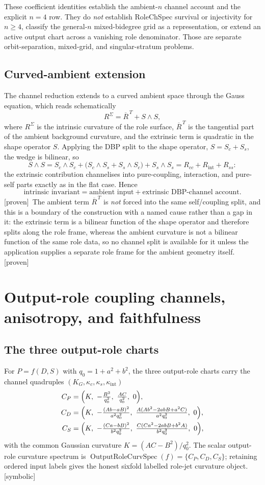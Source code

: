 \documentclass[11pt]{article}
\newcommand{\Proven}{\textsf{[proven]}}
\newcommand{\Symbolic}{\textsf{[symbolic]}}
\theoremstyle{plain}
\theoremstyle{definition}
\newcommand{\KG}{K_{G}}
\newcommand{\kc}{\kappa_{c}}
\newcommand{\kint}{\kappa_{\mathrm{int}}}
\newcommand{\ks}{\kappa_{s}}
\begin{document}
These coefficient identities establish the ambient-$n$ channel account and the explicit $n=4$ row.
They do \emph{not} establish RoleChSpec survival or injectivity for $n\ge4$, classify the general-$n$
mixed-bidegree grid as a representation, or extend an active output chart across a vanishing role
denominator.  Those are separate orbit-separation, mixed-grid, and singular-stratum problems.

\subsection{Curved-ambient extension}
The channel reduction extends to a curved ambient space through the Gauss equation, which reads
schematically
\[
R^\Sigma=\overline R^{\,T}+S\wedge S,
\]
where $R^\Sigma$ is the intrinsic curvature of the role surface, $\overline R^{\,T}$ is the tangential
part of the ambient background curvature, and the extrinsic term is quadratic in the shape operator
$S$. Applying the DBP split to the shape operator, $S=S_c+S_s$, the wedge is bilinear, so
\[
S\wedge S=S_c\wedge S_c+\bigl(S_c\wedge S_s+S_s\wedge S_c\bigr)+S_s\wedge S_s
=R_{cc}+R_{\mathrm{int}}+R_{ss}:
\]
the extrinsic contribution channelises into pure-coupling, interaction, and pure-self parts exactly as
in the flat case. Hence
\[
\text{intrinsic invariant}=\text{ambient input}+\text{extrinsic DBP-channel account}. 
\]
\Proven\ The ambient term $\overline R^{\,T}$ is \emph{not} forced into the same self/coupling split,
and this is a boundary of the construction with a named cause rather than a gap in it: the extrinsic
term is a bilinear function of the shape operator and therefore splits along the role frame, whereas
the ambient curvature is not a bilinear function of the same role data, so no channel split is
available for it unless the application supplies a separate role frame for the ambient geometry
itself. \Proven

\section{Output-role coupling channels, anisotropy, and faithfulness}
\label{sec:channels-named}

\subsection{The three output-role charts}
For $P=f(D,S)$ with $q_0=1+a^2+b^2$, the three output-role charts carry the channel quadruples
$(\KG,\kc,\ks,\kint)$
\begin{align*}
C_P&=\Bigl(K,\ -\tfrac{B^2}{q_0^2},\ \tfrac{AC}{q_0^2},\ 0\Bigr),\\
C_D&=\Bigl(K,\ -\tfrac{(Ab-aB)^2}{a^2q_0^2},\ \tfrac{A(Ab^2-2abB+a^2C)}{a^2q_0^2},\ 0\Bigr),\\
C_S&=\Bigl(K,\ -\tfrac{(Ca-bB)^2}{b^2q_0^2},\ \tfrac{C(Ca^2-2abB+b^2A)}{b^2q_0^2},\ 0\Bigr),
\end{align*}
with the common Gaussian curvature $K=(AC-B^2)/q_0^2$. The scalar output-role curvature spectrum is
$\operatorname{OutputRoleCurvSpec}(f)=\{C_P,C_D,C_S\}$; retaining ordered input labels gives the
honest sixfold labelled role-jet curvature object. \Symbolic
\end{document}
